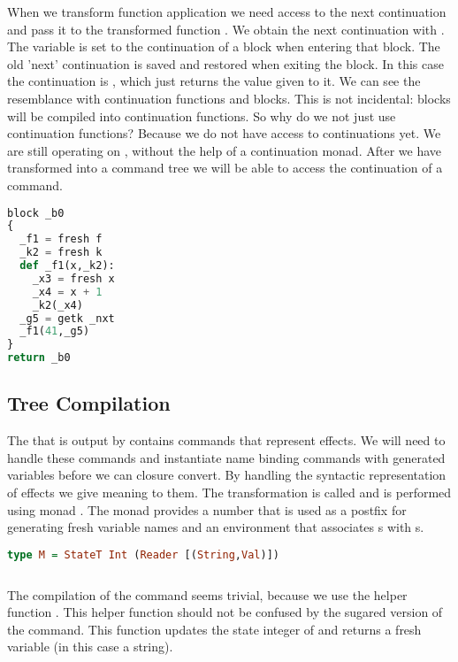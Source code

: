 When we transform function application we need access to the next continuation and pass it to the transformed function . We obtain the next continuation with . The variable  is set to the continuation of a block when entering that block. The old 'next' continuation is saved and restored when exiting the block. In this case the continuation is , which just returns the value given to it. We can see the resemblance with continuation functions and blocks. This is not incidental: blocks will be compiled into continuation functions. So why do we not just use continuation functions? Because we do not have access to continuations yet. We are still operating on , without the help of a continuation monad. After we have transformed into a command tree we will be able to access the continuation of a command.

\begin{lstlisting}[language=Python]
block _b0
{
  _f1 = fresh f
  _k2 = fresh k
  def _f1(x,_k2):
    _x3 = fresh x
    _x4 = x + 1
    _k2(_x4)
  _g5 = getk _nxt
  _f1(41,_g5)
}
return _b0
\end{lstlisting}

\subsection{\label{subsection:semtosyn}Tree Compilation}
The  that is output by  contains commands that represent effects. We will need to handle these commands and instantiate name binding commands with generated variables before we can closure convert. By handling the syntactic representation of effects we give meaning to them. The transformation is called  and is performed using monad . The monad  provides a number that is used as a postfix for generating fresh variable names and an environment that associates s with s.

\begin{lstlisting}[language=Haskell]
type M = StateT Int (Reader [(String,Val)])
\end{lstlisting}

\begin{lstlisting}[language=Haskell]
\end{lstlisting}

The compilation of the  command seems trivial, because we use the helper function . This helper function should not be confused by the sugared version of the  command. This function updates the state integer of  and returns a fresh variable (in this case a string).

